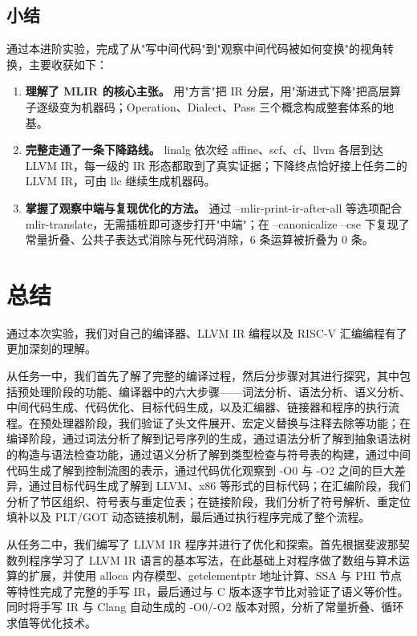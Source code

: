 \documentclass[UTF8,a4paper,10pt]{ctexart}
\begin{document}
\subsection{小结}

通过本进阶实验，完成了从"写中间代码"到"观察中间代码被如何变换"的视角转换，主要收获如下：

\begin{enumerate}[1.]
  \item \textbf{理解了 MLIR 的核心主张。} 用"方言"把 IR 分层，用"渐进式下降"把高层算子逐级变为机器码；Operation、Dialect、Pass 三个概念构成整套体系的地基。

  \item \textbf{完整走通了一条下降路线。} linalg 依次经 affine、scf、cf、llvm 各层到达 LLVM IR，每一级的 IR 形态都取到了真实证据；下降终点恰好接上任务二的 LLVM IR，可由 llc 继续生成机器码。

  \item \textbf{掌握了观察中端与复现优化的方法。} 通过 --mlir-print-ir-after-all 等选项配合 mlir-translate，无需插桩即可逐步打开"中端"；在 --canonicalize --cse 下复现了常量折叠、公共子表达式消除与死代码消除，6 条运算被折叠为 0 条。
\end{enumerate}

\section{总结}

通过本次实验，我们对自己的编译器、LLVM IR 编程以及 RISC-V 汇编编程有了更加深刻的理解。

从任务一中，我们首先了解了完整的编译过程，然后分步骤对其进行探究，其中包括预处理阶段的功能、编译器中的六大步骤——词法分析、语法分析、语义分析、中间代码生成、代码优化、目标代码生成，以及汇编器、链接器和程序的执行流程。在预处理器阶段，我们验证了头文件展开、宏定义替换与注释去除等功能；在编译阶段，通过词法分析了解到记号序列的生成，通过语法分析了解到抽象语法树的构造与语法检查功能，通过语义分析了解到类型检查与符号表的构建，通过中间代码生成了解到控制流图的表示，通过代码优化观察到 -O0 与 -O2 之间的巨大差异，通过目标代码生成了解到 LLVM、x86 等形式的目标代码；在汇编阶段，我们分析了节区组织、符号表与重定位表；在链接阶段，我们分析了符号解析、重定位填补以及 PLT/GOT 动态链接机制，最后通过执行程序完成了整个流程。

从任务二中，我们编写了 LLVM IR 程序并进行了优化和探索。首先根据斐波那契数列程序学习了 LLVM IR 语言的基本写法，在此基础上对程序做了数组与算术运算的扩展，并使用 alloca 内存模型、getelementptr 地址计算、SSA 与 PHI 节点等特性完成了完整的手写 IR，最后通过与 C 版本逐字节比对验证了语义等价性。同时将手写 IR 与 Clang 自动生成的 -O0/-O2 版本对照，分析了常量折叠、循环求值等优化技术。
\end{document}
